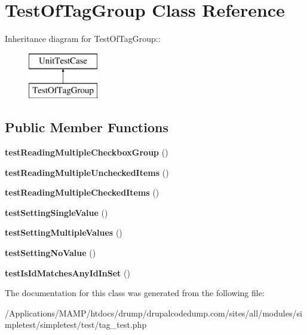 \hypertarget{class_test_of_tag_group}{
\section{TestOfTagGroup Class Reference}
\label{class_test_of_tag_group}
}
Inheritance diagram for TestOfTagGroup::\begin{figure}[H]
\begin{center}
\leavevmode
\includegraphics[height=2cm]{class_test_of_tag_group}
\end{center}
\end{figure}
\subsection*{Public Member Functions}
\begin{DoxyCompactItemize}
\item 
\hypertarget{class_test_of_tag_group_ab9028692621519af850e09bd078e3ba8}{
{\bfseries testReadingMultipleCheckboxGroup} ()}
\label{class_test_of_tag_group_ab9028692621519af850e09bd078e3ba8}

\item 
\hypertarget{class_test_of_tag_group_aed6e33b1b85429c19ae8c07f1a879e3f}{
{\bfseries testReadingMultipleUncheckedItems} ()}
\label{class_test_of_tag_group_aed6e33b1b85429c19ae8c07f1a879e3f}

\item 
\hypertarget{class_test_of_tag_group_a6567cc252f86c8d7c46f5285c8773b39}{
{\bfseries testReadingMultipleCheckedItems} ()}
\label{class_test_of_tag_group_a6567cc252f86c8d7c46f5285c8773b39}

\item 
\hypertarget{class_test_of_tag_group_afd7e0e35e1f55895088a698b6d86049e}{
{\bfseries testSettingSingleValue} ()}
\label{class_test_of_tag_group_afd7e0e35e1f55895088a698b6d86049e}

\item 
\hypertarget{class_test_of_tag_group_a5a9a3d58835a4d0b3676ac38a1be1e2d}{
{\bfseries testSettingMultipleValues} ()}
\label{class_test_of_tag_group_a5a9a3d58835a4d0b3676ac38a1be1e2d}

\item 
\hypertarget{class_test_of_tag_group_af8ab71630c61844ffb929ab713d36307}{
{\bfseries testSettingNoValue} ()}
\label{class_test_of_tag_group_af8ab71630c61844ffb929ab713d36307}

\item 
\hypertarget{class_test_of_tag_group_a014496bf303f3eb7171a0a64da347cff}{
{\bfseries testIsIdMatchesAnyIdInSet} ()}
\label{class_test_of_tag_group_a014496bf303f3eb7171a0a64da347cff}

\end{DoxyCompactItemize}


The documentation for this class was generated from the following file:\begin{DoxyCompactItemize}
\item 
/Applications/MAMP/htdocs/drump/drupalcodedump.com/sites/all/modules/simpletest/simpletest/test/tag\_\-test.php\end{DoxyCompactItemize}
